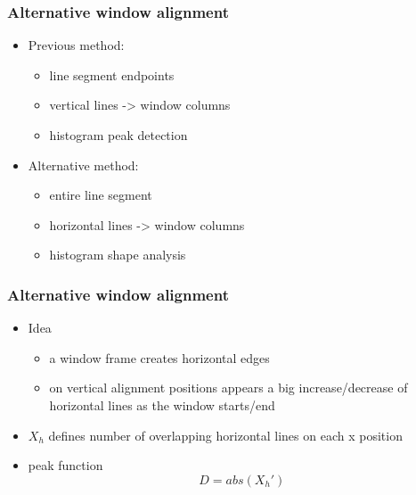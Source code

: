\documentclass{beamer}
\begin{document}
\frame
{
	\frametitle{Alternative window alignment}
	\begin{itemize}
	\item <+-| alert@+> Previous method: 
		\begin{itemize}
		\item <+-| alert@+> line segment endpoints
		\item <+-| alert@+> vertical lines -> window columns
		\item <+-| alert@+> histogram peak detection
		\end{itemize}
	\item <+-| alert@+> Alternative method: 
		\begin{itemize}
		\item <+-| alert@+> entire line segment
		\item <+-| alert@+> horizontal lines -> window columns
		\item <+-| alert@+> histogram shape analysis
		\end{itemize}
	\end{itemize}
}

\frame
{
	\frametitle{Alternative window alignment}
	\begin{itemize}
	\item <+-| alert@+> Idea
		\begin{itemize}
		\item <+-| alert@+> a window frame creates horizontal edges
		\item <+-| alert@+> on vertical alignment positions appears a big increase/decrease
		of horizontal lines as the window starts/end
		\end{itemize}
	\item <+-| alert@+> $X_{h}$ defines number of overlapping horizontal lines on each x position
	\item <+-| alert@+> peak function \[D = abs( X_{h}')\]
	\end{itemize}
}

\frame
{
}
\end{document}
